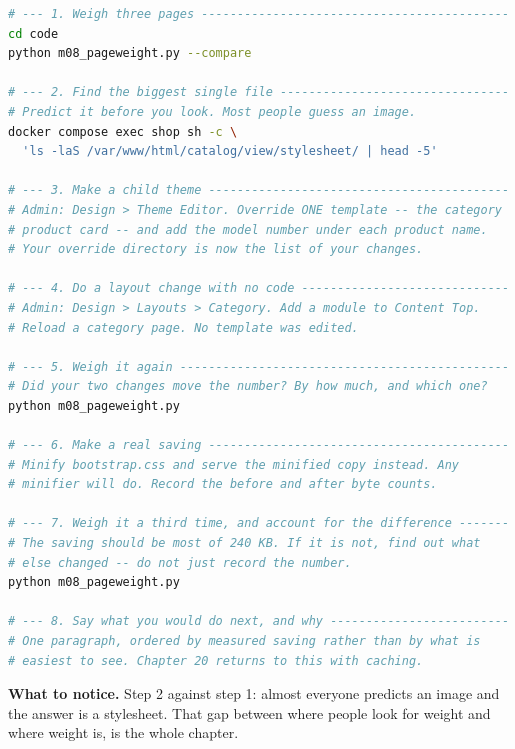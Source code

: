 \begin{lab}
\begin{lstlisting}[language=bash]
# --- 1. Weigh three pages -------------------------------------------
cd code
python m08_pageweight.py --compare

# --- 2. Find the biggest single file --------------------------------
# Predict it before you look. Most people guess an image.
docker compose exec shop sh -c \
  'ls -laS /var/www/html/catalog/view/stylesheet/ | head -5'

# --- 3. Make a child theme ------------------------------------------
# Admin: Design > Theme Editor. Override ONE template -- the category
# product card -- and add the model number under each product name.
# Your override directory is now the list of your changes.

# --- 4. Do a layout change with no code -----------------------------
# Admin: Design > Layouts > Category. Add a module to Content Top.
# Reload a category page. No template was edited.

# --- 5. Weigh it again ----------------------------------------------
# Did your two changes move the number? By how much, and which one?
python m08_pageweight.py

# --- 6. Make a real saving ------------------------------------------
# Minify bootstrap.css and serve the minified copy instead. Any
# minifier will do. Record the before and after byte counts.

# --- 7. Weigh it a third time, and account for the difference -------
# The saving should be most of 240 KB. If it is not, find out what
# else changed -- do not just record the number.
python m08_pageweight.py

# --- 8. Say what you would do next, and why -------------------------
# One paragraph, ordered by measured saving rather than by what is
# easiest to see. Chapter 20 returns to this with caching.
\end{lstlisting}

\smallskip
\textbf{What to notice.} Step 2 against step 1: almost everyone predicts an
image and the answer is a stylesheet. That gap between where people look for
weight and where weight is, is the whole chapter.
\end{lab}

